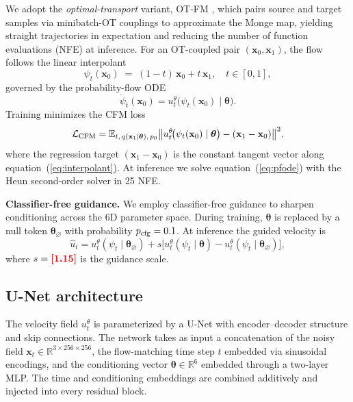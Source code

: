 \documentclass[usenatbib]{mnras}
\newcommand{\FILL}[1]{\textcolor{red}{\textbf{[#1]}}}
\newcommand{\thetavec}{\boldsymbol{\theta}}
\begin{document}
We adopt the \emph{optimal-transport} variant, OT-FM \citep{Lipman2023},
which pairs source and target samples via minibatch-OT couplings to
approximate the Monge map, yielding straight trajectories in expectation
and reducing the number of function evaluations (NFE) at inference.
For an OT-coupled pair $(\mathbf{x}_0,\mathbf{x}_1)$, the flow follows
the linear interpolant \citep{Albergo2023}
\begin{equation}
  \psi_t(\mathbf{x}_0) \;=\; (1-t)\,\mathbf{x}_0 + t\,\mathbf{x}_1,
  \quad t \in [0,1],
  \label{eq:interpolant}
\end{equation}
governed by the probability-flow ODE
\begin{equation}
  \dot{\psi}_t(\mathbf{x}_0)
    = u_t^\theta\!\bigl(\psi_t(\mathbf{x}_0) \mid \thetavec\bigr).
  \label{eq:pfode}
\end{equation}
Training minimizes the CFM loss
\begin{equation}
  \mathcal{L}_{\rm CFM} =
  \mathbb{E}_{t,\,q(\mathbf{x}_1\mid\thetavec),\,p_0}
  \bigl\|
    u_t^\theta\!\bigl(\psi_t(\mathbf{x}_0)\mid\thetavec\bigr)
    - (\mathbf{x}_1 - \mathbf{x}_0)
  \bigr\|^2,
  \label{eq:cfm}
\end{equation}
where the regression target $(\mathbf{x}_1-\mathbf{x}_0)$ is the
constant tangent vector along equation~(\ref{eq:interpolant}).
At inference we solve equation~(\ref{eq:pfode}) with the Heun
second-order solver in 25 NFE.

\textbf{Classifier-free guidance.}
We employ classifier-free guidance \citep[CFG;][]{Ho2022} to sharpen
conditioning across the 6D parameter space.
During training, $\thetavec$ is replaced by a null token
$\thetavec_\varnothing$ with probability $p_{\rm cfg} = 0.1$.
At inference the guided velocity is
\begin{equation}
  \hat{u}_t = u_t^\theta(\psi_t \mid \thetavec_\varnothing)
    + s\bigl[
        u_t^\theta(\psi_t \mid \thetavec)
      - u_t^\theta(\psi_t \mid \thetavec_\varnothing)
      \bigr],
  \label{eq:cfg}
\end{equation}
where $s = \FILL{1.15}$ is the guidance scale.

\subsection{U-Net architecture}
\label{sec:architecture}

The velocity field $u_t^\theta$ is parameterized by a U-Net
\citep{Ronneberger2015} with encoder--decoder structure and skip
connections.
The network takes as input a concatenation of the noisy field
$\mathbf{x}_t \in \mathbb{R}^{3 \times 256 \times 256}$,
the flow-matching time step $t$ embedded via sinusoidal encodings, and
the conditioning vector $\thetavec \in \mathbb{R}^6$ embedded through a
two-layer MLP.
The time and conditioning embeddings are combined additively and injected
into every residual block.
\end{document}
